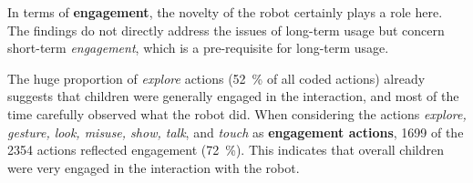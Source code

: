 \documentclass[letterpaper, 10pt, conference]{ieeeconf}
\begin{document}


In terms of \textbf{engagement}, the novelty of the robot certainly plays a role
here. The findings do not directly address the issues
of long-term usage but concern short-term \textit{engagement}, which is a
pre-requisite for long-term usage.


The huge proportion of \textit{explore} actions (52~\% of all coded actions)
already suggests that children were generally engaged in the interaction, and
most of the time carefully observed what the robot did. When considering the
actions \textit{explore, gesture, look, misuse, show, talk}, and \textit{touch}
as \textbf{engagement actions}, 1699 of the 2354 actions reflected engagement
(72~\%). This indicates that overall children were very engaged in the
interaction with the robot.
\end{document}
